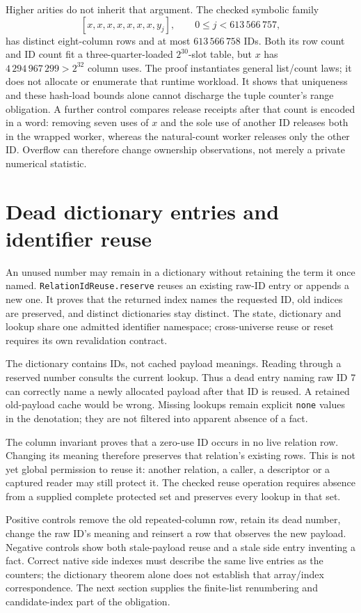 \documentclass[11pt,a4paper]{article}
\newcommand{\code}[1]{\nolinkurl{#1}}
\begin{document}
Higher arities do not inherit that argument. The checked symbolic family
\[
 [x,x,x,x,x,x,x,y_j],\qquad 0\leq j<613\,566\,757,
\]
has distinct eight-column rows and at most $613\,566\,758$ IDs. Both its row
count and ID count fit a three-quarter-loaded $2^{30}$-slot table, but $x$
has $4\,294\,967\,299>2^{32}$ column uses. The proof instantiates general
list/count laws; it does not allocate or enumerate that runtime workload.
It shows that uniqueness and these hash-load bounds alone cannot discharge
the tuple counter's range obligation. A further control compares release
receipts after that count is encoded in a word: removing seven uses of $x$
and the sole use of another ID releases both in the wrapped worker, whereas
the natural-count worker releases only the other ID. Overflow can therefore
change ownership observations, not merely a private numerical statistic.

\section{Dead dictionary entries and identifier reuse}

An unused number may remain in a dictionary without retaining the term it
once named. \code{RelationIdReuse.reserve} reuses an existing raw-ID entry or
appends a new one. It proves that the returned index names the requested ID,
old indices are preserved, and distinct dictionaries stay distinct.
The state, dictionary and lookup share one admitted identifier namespace;
cross-universe reuse or reset requires its own revalidation contract.

The dictionary contains IDs, not cached payload meanings. Reading through a
reserved number consults the current lookup. Thus a dead entry naming raw
ID 7 can correctly name a newly allocated payload after that ID is reused.
A retained old-payload cache would be wrong. Missing lookups remain explicit
\code{none} values in the denotation; they are not filtered into apparent
absence of a fact.

The column invariant proves that a zero-use ID occurs in no live relation
row. Changing its meaning therefore preserves that relation's existing rows.
This is not yet global permission to reuse it: another relation, a caller,
a descriptor or a captured reader may still protect it. The checked reuse
operation requires absence from a supplied complete protected set and
preserves every lookup in that set.

Positive controls remove the old repeated-column row, retain its dead number,
change the raw ID's meaning and reinsert a row that observes the new payload.
Negative controls show both stale-payload reuse and a stale side entry
inventing a fact. Correct native side indexes must describe the same live
entries as the counters; the dictionary theorem alone does not establish
that array/index correspondence. The next section supplies the finite-list
renumbering and candidate-index part of the obligation.
\end{document}

